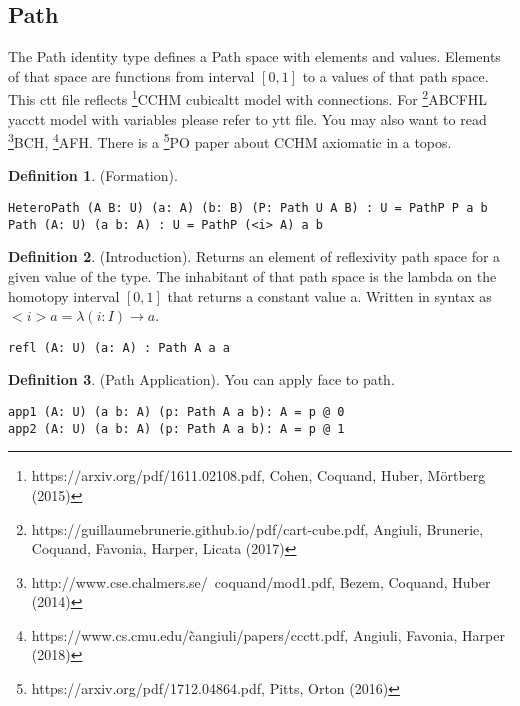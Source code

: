 \documentclass{article}
\theoremstyle{definition}
\newtheorem{definition}{Definition}
\begin{document}
\newpage
\subsection{Path}

The Path identity type defines a Path space with elements and values.
Elements of that space are functions from interval $[0,1]$ to a values of that path space.
This ctt file reflects \footnote{https://arxiv.org/pdf/1611.02108.pdf, Cohen, Coquand, Huber, M{\"{o}}rtberg (2015)}{CCHM} cubicaltt model with connections.
For \footnote{https://guillaumebrunerie.github.io/pdf/cart-cube.pdf, Angiuli, Brunerie, Coquand, Favonia, Harper, Licata (2017)}{ABCFHL} yacctt model with
variables please refer to ytt file. You may also want to
read \footnote{http://www.cse.chalmers.se/~coquand/mod1.pdf, Bezem, Coquand, Huber (2014)}{BCH},
\footnote{https://www.cs.cmu.edu/\~cangiuli/papers/ccctt.pdf, Angiuli, Favonia, Harper (2018)}{AFH}.
There is a \footnote{https://arxiv.org/pdf/1712.04864.pdf, Pitts, Orton (2016)}{PO} paper about CCHM axiomatic in a topos.

\begin{definition} (Formation).
\begin{lstlisting}
HeteroPath (A B: U) (a: A) (b: B) (P: Path U A B) : U = PathP P a b
Path (A: U) (a b: A) : U = PathP (<i> A) a b
\end{lstlisting}
\end{definition}

\begin{definition} (Introduction).
Returns an element of reflexivity path space for a given value of the type.
The inhabitant of that path space is the lambda on the homotopy
interval $[0,1]$ that returns a constant value a. Written in
syntax as $<i>a = \lambda(i:I)\rightarrow a$.
\begin{lstlisting}
refl (A: U) (a: A) : Path A a a
\end{lstlisting}
\end{definition}

\begin{definition} (Path Application).
You can apply face to path.
\begin{lstlisting}
app1 (A: U) (a b: A) (p: Path A a b): A = p @ 0
app2 (A: U) (a b: A) (p: Path A a b): A = p @ 1
\end{lstlisting}
\end{definition}
\end{document}

